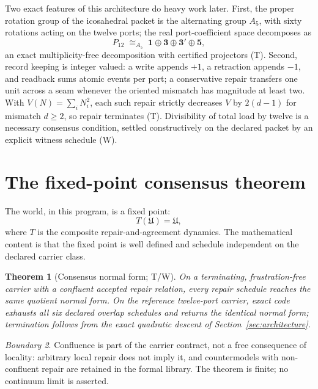 \documentclass[11pt]{article}
\newtheorem{theorem}{Theorem}[section]
\theoremstyle{remark}
\newtheorem{boundary}[theorem]{Boundary}
\newcommand{\evT}{\textsf{T}}   %
\newcommand{\evW}{\textsf{W}}   %
\begin{document}
Two exact features of this architecture do heavy work later. First, the
proper rotation group of the icosahedral packet is the alternating group
$A_{5}$, with sixty rotations acting on the twelve ports; the real
port-coefficient space decomposes as
\begin{equation}
P_{12}\;\cong_{A_5}\;\mathbf 1\oplus\mathbf 3\oplus\mathbf 3'\oplus\mathbf 5,
\label{eq:bands}
\end{equation}
an exact multiplicity-free decomposition with certified projectors
(\evT). Second, record keeping is integer valued: a write appends $+1$, a
retraction appends $-1$, and readback sums atomic events per port; a
conservative repair transfers one unit across a seam whenever the oriented
mismatch has magnitude at least two. With $V(N)=\sum_i N_i^{2}$, each such
repair strictly decreases $V$ by $2(d-1)$ for mismatch $d\ge 2$, so repair
terminates (\evT). Divisibility of total load by twelve is a necessary
consensus condition, settled constructively on the declared packet by an
explicit witness schedule (\evW).

\section{The fixed-point consensus theorem}
\label{sec:consensus}

The world, in this program, is a fixed point:
\begin{equation}
T(\mathfrak U)=\mathfrak U,
\end{equation}
where $T$ is the composite repair-and-agreement dynamics. The mathematical
content is that the fixed point is well defined and schedule independent on
the declared carrier class.

\begin{theorem}[Consensus normal form; \evT/\evW]
\label{thm:confluence}
On a terminating, frustration-free carrier with a confluent accepted repair
relation, every repair schedule reaches the same quotient normal form. On
the reference twelve-port carrier, exact code exhausts all six declared
overlap schedules and returns the identical normal form; termination follows
from the exact quadratic descent of Section~\ref{sec:architecture}.
\end{theorem}

\begin{boundary}
Confluence is part of the carrier contract, not a free consequence of
locality: arbitrary local repair does not imply it, and countermodels with
non-confluent repair are retained in the formal library. The theorem is
finite; no continuum limit is asserted.
\end{boundary}
\end{document}
